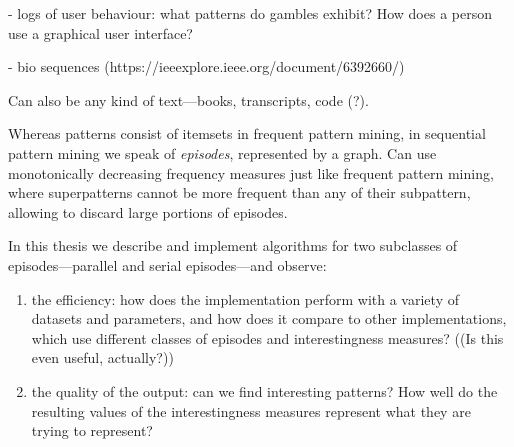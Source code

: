 - logs of user behaviour: what patterns do gambles exhibit? How does a person use a graphical user interface?

- bio sequences (https://ieeexplore.ieee.org/document/6392660/)

Can also be any kind of text---books, transcripts, code (?).

Whereas patterns consist of itemsets in frequent pattern mining, in sequential pattern mining we speak of \emph{episodes}, represented by a graph. Can use monotonically decreasing frequency measures just like frequent pattern mining, where superpatterns cannot be more frequent than any of their subpattern, allowing to discard large portions of episodes.

In this thesis we describe and implement algorithms for two subclasses of episodes---parallel and serial episodes---and observe:

\begin{enumerate}
\item the efficiency: how does the implementation perform with a variety of datasets and parameters, and how does it compare to other implementations, which use different classes of episodes and interestingness measures? ((Is this even useful, actually?))
\item the quality of the output: can we find interesting patterns? How well do the resulting values of the interestingness measures represent what they are trying to represent?
\end{enumerate}
